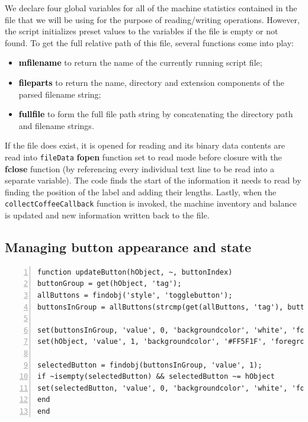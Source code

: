 \documentclass[a4paper, 11pt]{article}
\begin{document}
\noindent We declare four global variables for all of the machine statistics contained in the file that we will be using for the purpose of reading/writing operations. However, the script initializes preset values to the variables if the file is empty or not found. To get the full relative path of this file, several functions come into play:

\begin{itemize}
\item \textbf{\textcolor{black}{mfilename}} to return the name of the currently running script file;
\item \textbf{\textcolor{black}{fileparts}} to return the name, directory and extension components of the parsed filename string;
\item \textbf{\textcolor{black}{fullfile}} to form the full file path string by concatenating the directory path and filename strings.
\end{itemize}

\noindent If the file does exist, it is opened for reading and its binary data contents are read into \texttt{fileData} \textbf{fopen} function set to read mode before closure with the \textbf{fclose }function (by referencing every individual text line to be read into a separate variable). The code finds the start of the information it needs to read by finding the position of the label and adding their lengths. Lastly, when the \texttt{collectCoffeeCallback} function is invoked, the machine inventory and balance is updated and new information written back to the file. 
\vspace{5mm}
\subsection{Managing button appearance and state}
\begin{lstlisting}[style=Matlab-editor, numbers = left, frame = single]
% Manages the visual appearance and selection state of buttons
function updateButton(hObject, ~, buttonIndex)
buttonGroup = get(hObject, 'tag');
allButtons = findobj('style', 'togglebutton');
buttonsInGroup = allButtons(strcmp(get(allButtons, 'tag'), buttonGroup));

set(buttonsInGroup, 'value', 0, 'backgroundcolor', 'white', 'foregroundcolor', '#FF5F1F');
set(hObject, 'value', 1, 'backgroundcolor', '#FF5F1F', 'foregroundcolor', 'white');

selectedButton = findobj(buttonsInGroup, 'value', 1);
if ~isempty(selectedButton) && selectedButton ~= hObject
set(selectedButton, 'value', 0, 'backgroundcolor', 'white', 'foregroundcolor', '#FF5F1F');
end
end
\end{lstlisting}
\end{document}
